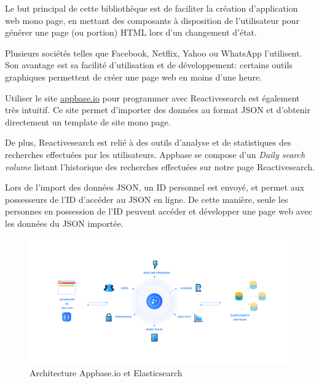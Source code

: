 Le but principal de cette bibliothèque est de faciliter la création d'application web mono page, en mettant des composants à disposition de l'utilisateur pour générer une page (ou portion) HTML lors d'un changement d'état.

Plusieurs sociétés telles que Facebook, Netflix, Yahoo ou WhatsApp l'utilisent.
Son avantage est sa facilité d'utilisation et de développement: certains outils graphiques permettent de créer une page web en moins d'une heure.

Utiliser le site \href{https://appbase.io/}{appbase.io} pour programmer avec Reactivesearch est également très intuitif.
Ce site permet d'importer des données au format JSON et d'obtenir directement un template de site mono page\@.

De plus, Reactivesearch est relié à des outils d'analyse et de statistiques des recherches effectuées par les utilisateurs.
Appbase se compose d'un \textit{Daily search volume} listant l'historique des recherches effectuées sur notre page Reactivesearch. 

Lors de l'import des données JSON, un ID personnel est envoyé, et permet aux possesseurs de l'ID d'accéder au JSON en ligne.
De cette manière, seule les personnes en possession de l'ID peuvent accéder et développer une page web avec les données du JSON importée. 

\begin{figure}[h!]
  \centering
  \includegraphics[width=\textwidth]{images/ArchitectureElasticsearchAppbase.png}
	\caption[]{Architecture Appbase.io et Elasticsearch}
	\label{archi_appbase}
\end{figure}


